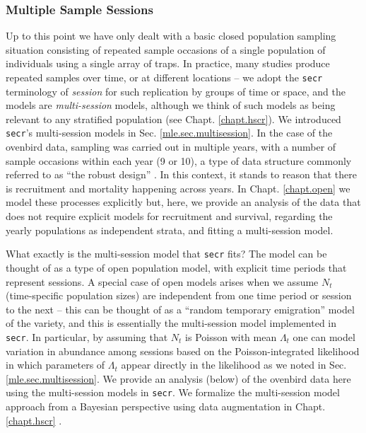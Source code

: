 \subsubsection{Multiple Sample Sessions}

Up to this point we have only dealt with a basic closed population
sampling situation consisting of repeated sample occasions of a single
population of individuals using a single array of traps. In practice,
many studies produce repeated samples over time, or at different
locations -- we adopt the \mbox{\tt secr} terminology of {\it session}
for such replication by groups of time or space, and the models are
{\it multi-session} models, although we think of such models as being
relevant to any stratified population (see Chapt. \ref{chapt.hscr}).
We introduced \mbox{\tt secr}'s
multi-session models in Sec. \ref{mle.sec.multisession}.  In the case
of the ovenbird data, sampling was carried out in multiple years, with
a number of sample occasions within each year (9 or 10), a type of
data structure commonly referred to as ``the robust
design'' \citep{pollock:1982}.  In this context,
it stands to reason that there is recruitment and mortality happening
across years. In Chapt. \ref{chapt.open} we model these processes
explicitly but, here, we provide an analysis of the data that does not
require explicit models for recruitment and survival, regarding the
yearly populations as independent strata, and fitting a multi-session
model.

What exactly is the multi-session model that \mbox{\tt secr} fits? The
model can be thought of as a type of open population model, 
with explicit time periods that represent sessions.
 A special case of open models arises when
we assume $N_{t}$ (time-specific population sizes) are independent
from one time period or session to the next -- this can be thought of
as a ``random temporary emigration'' model of the
\citet{kendall_etal:1997} variety, and this is essentially the
multi-session model implemented in \mbox{\tt secr}.  In particular, by
assuming that $N_{t}$ is Poisson with mean $\Lambda_{t}$ one can model
variation in abundance among sessions based on the Poisson-integrated
likelihood in which parameters of $\Lambda_{t}$ appear directly in the
likelihood as we noted in Sec. \ref{mle.sec.multisession}.  We provide
an analysis (below) of the ovenbird data here using the multi-session
models in \mbox{\tt secr}.  We formalize the multi-session model
approach from a Bayesian perspective using data augmentation in
Chapt. \ref{chapt.hscr} \citep{converse_royle:2012,royle_converse:2013}.

